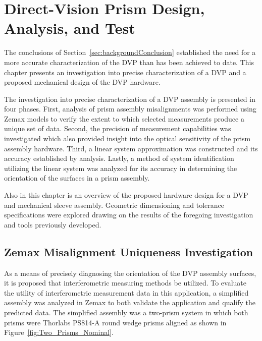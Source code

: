 \chapter{Direct-Vision Prism Design, Analysis, and Test}
\label{ch:DVP}

The conclusions of Section~\ref{sec:backgroundConclusion} established the need for a more accurate characterization of the \acf{DVP} than has been achieved to date.  This chapter presents an investigation into precise characterization of a \ac{DVP} and a proposed mechanical design of the \ac{DVP} hardware.

The investigation into precise characterization of a \ac{DVP} assembly is presented in four phases. First, analysis of prism assembly misalignments was performed using Zemax models to verify the extent to which selected measurements produce a unique set of data. Second, the precision of measurement capabilities was investigated which also provided insight into the optical sensitivity of the prism assembly hardware. Third, a linear system approximation was constructed and its accuracy established by analysis. Lastly, a method of system identification utilizing the linear system was analyzed for its accuracy in determining the orientation of the surfaces in a prism assembly.

Also in this chapter is an overview of the proposed hardware design for a \ac{DVP} and mechanical sleeve assembly. Geometric dimensioning and tolerance specifications were explored drawing on the results of the foregoing investigation and tools previously developed.

\section{Zemax Misalignment Uniqueness Investigation}
\label{sec:misalignmentUniqueness}

As a means of precisely diagnosing the orientation of the \ac{DVP} assembly surfaces, it is proposed that interferometric measuring methods be utilized. To evaluate the utility of interferometric measurement data in this application, a simplified assembly was analyzed in Zemax to both validate the application and qualify the predicted data. The simplified assembly was a two-prism system in which both prisms were Thorlabs PS814-A round wedge prisms aligned as shown in Figure~\ref{fig:Two_Prisms_Nominal}.

